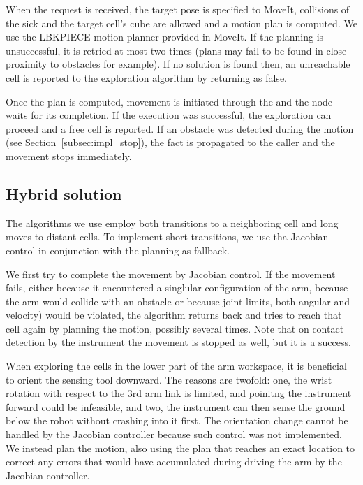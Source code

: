\documentclass[buriama8_dp.tex]{subfiles}
\begin{document}
When the request is received, the target pose is specified to MoveIt, collisions of the sick and the target cell's cube are allowed and a motion plan is computed. We use the LBKPIECE motion planner provided in MoveIt. If the planning is unsuccessful, it is retried at most two times (plans may fail to be found in close proximity to obstacles for example). If no solution is found then, an unreachable cell is reported to the exploration algorithm by returning  as false.

Once the plan is computed, movement is initiated through the  and the node waits for its completion. If the execution was successful, the exploration can proceed and a free cell is reported. If an obstacle was detected during the motion (see Section~\ref{subsec:impl_stop}), the fact is propagated to the caller and the movement stops immediately.

\subsection{Hybrid solution}
\label{subsec:impl_drv}


The algorithms we use employ both transitions to a neighboring cell and long moves to distant cells. To implement short transitions, we use tha Jacobian control in conjunction with the planning as fallback.

We first try to complete the movement by Jacobian control. If the movement fails, either because it encountered a singlular configuration of the arm, because the arm would collide with an obstacle or because joint limits, both angular and velocity) would be violated, the algorithm returns back and tries to reach that cell again by planning the motion, possibly several times. Note that on contact detection by the instrument the movement is stopped as well, but it is a success.

When exploring the cells in the lower part of the arm workspace, it is beneficial to orient the sensing tool downward. The reasons are twofold: one, the wrist rotation with respect to the 3rd arm link is limited, and poinitng the instrument forward could be infeasible, and two, the instrument can then sense the ground below the robot without crashing into it first. The orientation change cannot be handled by the Jacobian controller because such control was not implemented. We instead plan the motion, also using the plan that reaches an exact location to correct any errors that would have accumulated during driving the arm by the Jacobian controller.
\end{document}
